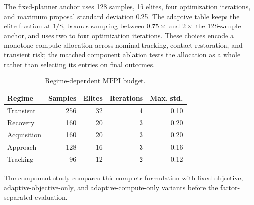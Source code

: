 The fixed-planner anchor uses 128 samples, 16 elites, four optimization
iterations, and maximum proposal standard deviation 0.25. The adaptive table
keeps the elite fraction at $1/8$, bounds sampling between $0.75\times$ and
$2\times$ the 128-sample anchor, and uses two to four optimization iterations.
These choices encode a monotone compute allocation across nominal tracking,
contact restoration, and transient risk; the matched component ablation tests
the allocation as a whole rather than selecting its entries on final outcomes.

\begin{table}[t]
\centering
\caption{Regime-dependent MPPI budget.}
\label{tab:adaptive_budget}
\small
\begin{tabular}{lrrrr}
\toprule
Regime & Samples & Elites & Iterations & Max. std. \\
\midrule
Transient  & 256 & 32 & 4 & 0.10 \\
Recovery   & 160 & 20 & 3 & 0.20 \\
Acquisition& 160 & 20 & 3 & 0.20 \\
Approach   & 128 & 16 & 3 & 0.16 \\
Tracking   &  96 & 12 & 2 & 0.12 \\
\bottomrule
\end{tabular}
\end{table}

The component study compares this complete formulation with fixed-objective,
adaptive-objective-only, and adaptive-compute-only variants before the
factor-separated evaluation.
